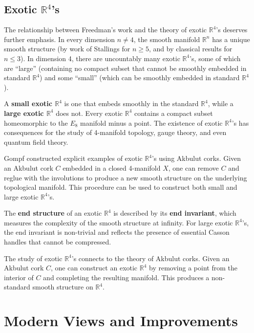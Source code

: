\subsection*{Exotic $\mathbb{R}^4$'s}

The relationship between Freedman's work and the theory of exotic $\mathbb{R}^4$'s deserves further emphasis. In every dimension $n \neq 4$, the smooth manifold $\mathbb{R}^n$ has a unique smooth structure (by work of Stallings for $n \geq 5$, and by classical results for $n \leq 3$). In dimension 4, there are uncountably many exotic $\mathbb{R}^4$'s, some of which are ``large'' (containing no compact subset that cannot be smoothly embedded in standard $\mathbb{R}^4$) and some ``small'' (which can be smoothly embedded in standard $\mathbb{R}^4$).

A \textbf{small exotic $\mathbb{R}^4$} is one that embeds smoothly in the standard $\mathbb{R}^4$, while a \textbf{large exotic $\mathbb{R}^4$} does not. Every exotic $\mathbb{R}^4$ contains a compact subset homeomorphic to the $E_8$ manifold minus a point. The existence of exotic $\mathbb{R}^4$'s has consequences for the study of 4-manifold topology, gauge theory, and even quantum field theory.

Gompf constructed explicit examples of exotic $\mathbb{R}^4$'s using Akbulut corks. Given an Akbulut cork $C$ embedded in a closed 4-manifold $X$, one can remove $C$ and reglue with the involutions to produce a new smooth structure on the underlying topological manifold. This procedure can be used to construct both small and large exotic $\mathbb{R}^4$'s.

The \textbf{end structure} of an exotic $\mathbb{R}^4$ is described by its \textbf{end invariant}, which measures the complexity of the smooth structure at infinity. For large exotic $\mathbb{R}^4$'s, the end invariant is non-trivial and reflects the presence of essential Casson handles that cannot be compressed.

The study of exotic $\mathbb{R}^4$'s connects to the theory of Akbulut corks. Given an Akbulut cork $C$, one can construct an exotic $\mathbb{R}^4$ by removing a point from the interior of $C$ and completing the resulting manifold. This produces a non-standard smooth structure on $\mathbb{R}^4$.

\section{Modern Views and Improvements}

